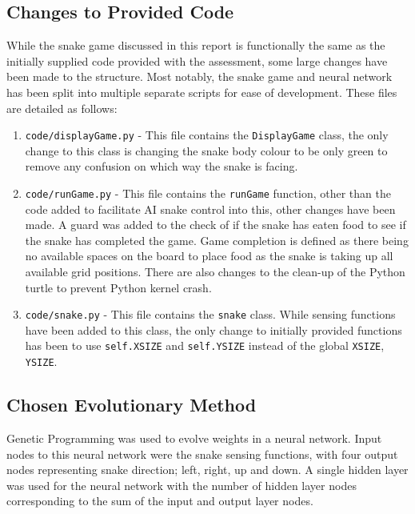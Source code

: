 \subsection{Changes to Provided Code}
While the snake game discussed in this report is functionally the same as the initially supplied code provided with the assessment, some large changes have been made to the structure. Most notably, the snake game and neural network has been split into multiple separate scripts for ease of development. These files are detailed as follows:

\begin{enumerate}
  \item \verb|code/displayGame.py| - This file contains the \verb|DisplayGame| class, the only change to this class is changing the snake body colour to be only green to remove any confusion on which way the snake is facing.
  \item \verb|code/runGame.py| - This file contains the \verb|runGame| function, other than the code added to facilitate AI snake control into this, other changes have been made. A guard was added to the check of if the snake has eaten food to see if the snake has completed the game. Game completion is defined as there being no available spaces on the board to place food as the snake is taking up all available grid positions. There are also changes to the clean-up of the Python turtle to prevent Python kernel crash. 
  \item \verb|code/snake.py| - This file contains the \verb|snake| class. While sensing functions have been added to this class, the only change to initially provided functions has been to use \verb|self.XSIZE| and \verb|self.YSIZE| instead of the global \verb|XSIZE|, \verb|YSIZE|.
\end{enumerate}

\subsection{Chosen Evolutionary Method}
Genetic Programming was used to evolve weights in a neural network. Input nodes to this neural network were the snake sensing functions, with four output nodes representing snake direction; left, right, up and down. A single hidden layer was used for the neural network with the number of hidden layer nodes corresponding to the sum of the input and output layer nodes.

